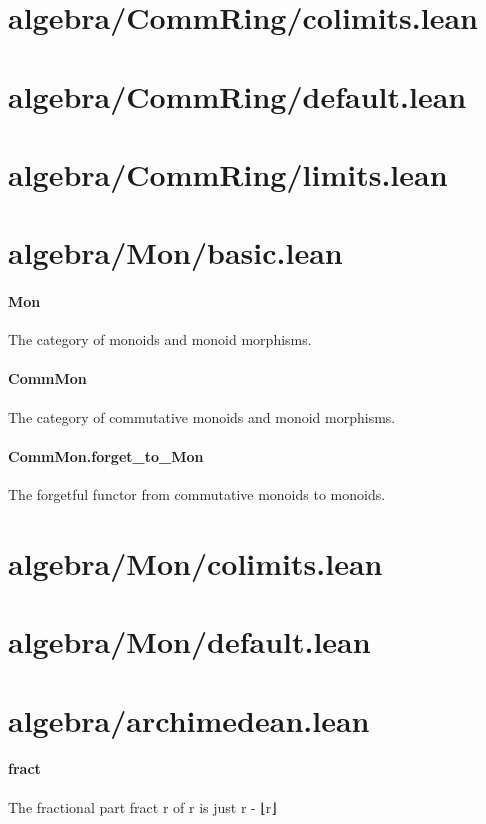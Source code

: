 \documentclass{article}
\begin{document}
\section{algebra/CommRing/colimits.lean}\section{algebra/CommRing/default.lean}\section{algebra/CommRing/limits.lean}\section{algebra/Mon/basic.lean}\paragraph{Mon}
\par
The category of monoids and monoid morphisms.
\paragraph{CommMon}
\par
The category of commutative monoids and monoid morphisms.
\paragraph{CommMon.forget\_to\_Mon}
\par
The forgetful functor from commutative monoids to monoids.
\section{algebra/Mon/colimits.lean}\section{algebra/Mon/default.lean}\section{algebra/archimedean.lean}\paragraph{fract}
\par
The fractional part fract r of r is just r - ⌊r⌋
\end{document}
